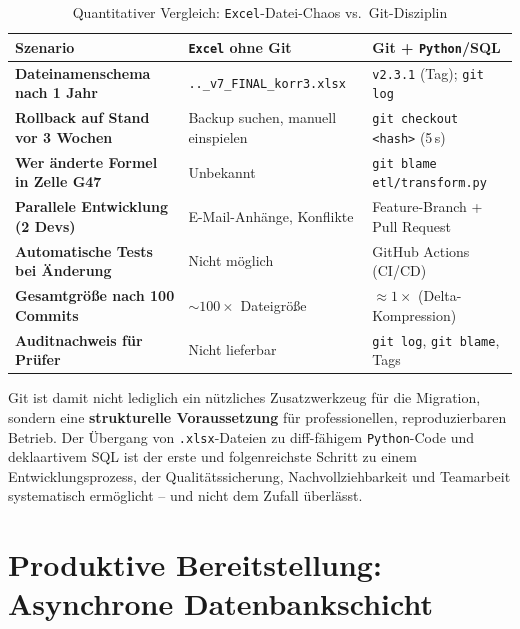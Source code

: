 \documentclass[12pt,a4paper]{report}
\theoremstyle{definition}
\theoremstyle{remark}
\newcommand{\excel}{\texttt{Excel}}
\newcommand{\py}{\texttt{Python}}
\newcommand{\code}[1]{\texttt{#1}}
\begin{document}
\begin{table}[H]
\centering
\caption{Quantitativer Vergleich: \excel-Datei-Chaos vs.\ Git-Disziplin}
\label{tab:git-quantitativ}
\renewcommand{\arraystretch}{1.4}
\begin{tabularx}{\linewidth}{>{\footnotesize\bfseries}l
                              >{\footnotesize}X
                              >{\footnotesize}X}
\toprule
Szenario                        & \excel{} ohne Git              & Git + \py{}/SQL \\
\midrule
Dateinamenschema nach 1 Jahr    & \code{..\_v7\_FINAL\_korr3.xlsx} & \code{v2.3.1} (Tag); \code{git log} \\
Rollback auf Stand vor 3 Wochen & Backup suchen, manuell einspielen & \code{git checkout <hash>} (5\,s) \\
Wer änderte Formel in Zelle G47 & Unbekannt                       & \code{git blame etl/transform.py} \\
Parallele Entwicklung (2 Devs)  & E-Mail-Anhänge, Konflikte       & Feature-Branch + Pull Request \\
Automatische Tests bei Änderung & Nicht möglich                   & GitHub Actions (CI/CD) \\
Gesamtgröße nach 100 Commits    & $\sim100\times$ Dateigröße      & $\approx 1\times$ (Delta-Kompression) \\
Auditnachweis für Prüfer        & Nicht lieferbar                 & \code{git log}, \code{git blame}, Tags \\
\bottomrule
\end{tabularx}
\end{table}

Git ist damit nicht lediglich ein nützliches Zusatzwerkzeug für die
Migration, sondern eine \textbf{strukturelle Voraussetzung} für
professionellen, reproduzierbaren Betrieb.
Der Übergang von \code{.xlsx}-Dateien zu diff-fähigem \py-Code und
deklaartivem SQL ist der erste und folgenreichste Schritt zu einem
Entwicklungsprozess, der Qualitätssicherung, Nachvollziehbarkeit
und Teamarbeit systematisch ermöglicht -- und nicht dem Zufall
überlässt.

\newpage
\chapter{Produktive Bereitstellung: Asynchrone Datenbankschicht}
\label{sec:prod}
\end{document}
